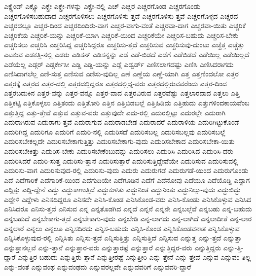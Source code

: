 {ಎಕ್ಸ್ಟೆಂಡ್
ಎಕ್ಸ್ಪೊ
ಎಕ್ಸ್ರೇ
ಎಕ್ಸ್ರೇ-ಗಳನ್ನು
ಎಕ್ಸ್ರೇ-ನಲ್ಲಿ
ಎಚ್
ಎಚ್ಚರ
ಎಚ್ಚರಗೊಂಡ
ಎಚ್ಚರಗೊಂಡು
ಎಚ್ಚರಗೊಳಿಸಬಹುದಾದ
ಎಚ್ಚರಗೊಳಿಸಲು
ಎಚ್ಚರಗೊಳಿಸು-ತ್ತದೆ
ಎಚ್ಚರಗೊಳಿಸು-ತ್ತವೆ
ಎಚ್ಚರಗೊಳ್ಳದ
ಎಚ್ಚರದ
ಎಚ್ಚರದಲ್ಲೂ
ಎಚ್ಚರ-ದಿಂದ
ಎಚ್ಚರದಿಂದಿರು-ವಾಗ
ಎಚ್ಚರ-ವಾಗು-ವಂತೆ
ಎಚ್ಚರವಾ-ದಾಗ
ಎಚ್ಚರವಾ-ಯಿತು
ಎಚ್ಚರಿಕೆ
ಎಚ್ಚರಿಕೆಯ
ಎಚ್ಚರಿಕೆ-ಯನ್ನು
ಎಚ್ಚರಿಕೆ-ಯಾಗಿ
ಎಚ್ಚರಿಕೆ-ಯಿಂದ
ಎಚ್ಚರಿಕೆಯೇ
ಎಚ್ಚರಿಸ-ಬಹುದು
ಎಚ್ಚರಿಸ-ಬೇಕು
ಎಚ್ಚರಿಸಲು
ಎಚ್ಚರಿಸಿ
ಎಚ್ಚರಿಸಿದ್ದ
ಎಚ್ಚರಿಸಿದ್ದರೂ
ಎಚ್ಚರಿಸು-ತ್ತದೆ
ಎಚ್ಚರಿಸುವ
ಎಚ್ಚರಿಸುವು-ದುಂಟು
ಎಚ್ಚೆತ್ತ
ಎಚ್ಚೆತ್ತು
ಎಟಕುವ
ಎಡಕತ್ತಿ-ನಲ್ಲಿ
ಎಡರು
ಎಡಿಸನ್
ಎಡಿಸನ್ನನ್ನು
ಎಡೆ
ಎಡೆ-ಬಿಡದೆ
ಎಡೆಗೆ
ಎಡೆಬಿಡದೆ
ಎಡೆಯಿಲ್ಲ
ಎಡೆಯಿಲ್ಲದೆ
ಎಡೆಯೆಲ್ಲ
ಎಡ್ಗರ್
ಎಡ್ಗರ್ಕೇಸೀ
ಎಡ್ಡಿ
ಎಡ್ಡಿ-ಯನ್ನು
ಎಡ್ಲೆ
ಎಡ್ವರ್ಡ್
ಎಣಿಸಲಾಗದಷ್ಟು
ಎಣಿಸಿ
ಎಣಿಸಿದರಾಗದು
ಎಣಿಸಿದಾಗಲೆಲ್ಲ
ಎಣಿ-ಸುತ್ತ
ಎಣಿಸುವ
ಎಣಿಸು-ವುದಿಲ್ಲ
ಎಣೆ
ಎಣ್ಣೆಯ
ಎಣ್ಣೆ-ಯಾಗಿ
ಎತ್ತ
ಎತ್ತಣಿಂದಲೋ
ಎತ್ತರ
ಎತ್ತರಕ್ಕೆ
ಎತ್ತರದ
ಎತ್ತರ-ದಲ್ಲಿ
ಎತ್ತರದಲ್ಲಿದ್ದರೂ
ಎತ್ತರದಲ್ಲಿದ್ದ-ವರು
ಎತ್ತರದಲ್ಲಿರುವವರೆಂದು
ಎತ್ತರ-ದಿಂದ
ಎತ್ತರಬದುಕಿನ
ಎತ್ತರ-ವನ್ನು
ಎತ್ತರ-ವನ್ನೂ
ಎತ್ತರ-ವಾದ
ಎತ್ತರವಿರುವ
ಎತ್ತರವೆಷ್ಟು
ಎತ್ತಲಾರದಾದ
ಎತ್ತಲು
ಎತ್ತಿ
ಎತ್ತಿಕಟ್ಟಿ
ಎತ್ತಿಕೊಳ್ಳಲು
ಎತ್ತಿತಂದು
ಎತ್ತಿತೋರಿ
ಎತ್ತಿನ
ಎತ್ತಿಬಿಡಬಲ್ಲೆ
ಎತ್ತಿಹಿಡಿದು
ಎತ್ತಿಹುದು
ಎತ್ತುಗಳಿಂದಕಾಯವೆಂಬ
ಎತ್ತುತ್ತಿದ್ದ
ಎತ್ತು-ತ್ತೇವೆ
ಎತ್ತುವ
ಎತ್ತುವ-ವರು
ಎತ್ತುವುದೇ
ಎದು-ರಲ್ಲಿ
ಎದುರಲ್ಲಿಟ್ಟು
ಎದುರಲ್ಲೇ
ಎದುರಾಗಿ
ಎದುರಾಗಿರುವ
ಎದುರಾಗು-ತ್ತವೆ
ಎದುರಾಗುವ
ಎದುರಾಡಬೇಡ
ಎದುರಾದರೆ
ಎದುರಾಳಿಯ
ಎದುರಿಗಿಟ್ಟುಕೊಂಡೆ
ಎದುರಿಗಿದ್ದ
ಎದುರಿಗೂ
ಎದುರಿಗೆ
ಎದುರಿ-ನಲ್ಲಿ
ಎದುರಿಸದೆ
ಎದುರಿಸಬಲ್ಲ
ಎದುರಿಸಬಲ್ಲವು
ಎದುರಿಸಬಲ್ಲೆ
ಎದುರಿಸಬೇಕಲ್ಲದೇ
ಎದುರಿಸಬೇಕಾಗುತ್ತಿತ್ತು
ಎದುರಿಸಬೇಕಾಗು-ವುದು
ಎದುರಿಸಬೇಕಾದ
ಎದುರಿಸಬೇಕಾ-ಯಿತು
ಎದುರಿಸಬೇಕಿತ್ತು
ಎದುರಿಸ-ಬೇಕು
ಎದುರಿಸಬೇಕೆಂಬುದನ್ನು
ಎದುರಿಸಲು
ಎದುರಿಸಿ
ಎದುರಿಸಿದ
ಎದುರಿಸಿ-ದರು
ಎದುರಿಸಿದರೆ
ಎದುರಿ-ಸುತ್ತ
ಎದುರಿಸು-ತ್ತಾನೆ
ಎದುರಿಸುತ್ತಾರೆ
ಎದುರಿಸುತ್ತಿದ್ದೇವೆಯೇ
ಎದುರಿಸುವ
ಎದುರಿಸುವಲ್ಲಿ
ಎದುರಿಸು-ವಾಗ
ಎದುರಿಸುವುದ-ರಲ್ಲಿ
ಎದುರಿಸು-ವುದು
ಎದುರು
ಎದುರುಗಡೆ
ಎದುರುಗಡೆ-ಯಿಂದ
ಎದುರುಗೊಂಡು
ಎದೆ
ಎದೆಗಾರಿಕೆ
ಎದೆಗಾರಿಕೆ-ಯಿಂದ
ಎದೆಗುದಿಯೇ
ಎದೆಗೂಡಿನ
ಎದೆಗೆ
ಎದೆನೋವು
ಎದೆಯೂ
ಎದೆಯೊಡ್ಡಿ
ಎದ್ದಾಗ
ಎದ್ದಿತ್ತು
ಎದ್ದಿ-ದ್ದೇನೆ
ಎದ್ದು
ಎದ್ದುಕಾಣುತ್ತಿದೆ
ಎದ್ದುಕುಳಿತು
ಎದ್ದುನಿಂತ
ಎದ್ದುನಿಂತು
ಎದ್ದುನಿಲ್ಲು-ವುದು
ಎದ್ದುಬಿದ್ದು
ಎದ್ದೇಳಿ
ಎದ್ದೇಳು
ಎನಿಸದಿದ್ದರೂ
ಎನಿಸದೇ
ಎನಿಸಿ-ಕೊಂಡ
ಎನಿಸಿಕೊಂಡ-ವರು
ಎನಿಸಿ-ಕೊಂಡು
ಎನಿಸಿಕೊಳ್ಳುವ
ಎನಿಸಿದ
ಎನಿಸಿದರೂ
ಎನಿಸು-ತ್ತದೆ
ಎನಿಸುವ
ಎನ್ನ
ಎನ್ನತೊಡಗಿದ
ಎನ್ನದೆ
ಎನ್ನನೆ
ಎನ್ನನೇ
ಎನ್ನಬಲ್ಲೆವೆ
ಎನ್ನಬಹು
ಎನ್ನ-ಬಹುದು
ಎನ್ನಬಹುದೆ
ಎನ್ನಬೇಕಾಗು-ತ್ತದೆ
ಎನ್ನಬೇಕಾಗು-ವುದು
ಎನ್ನಬೇಡಿ
ಎನ್ನ-ಲಾಗದು
ಎನ್ನ-ಲಾಗಿದೆ
ಎನ್ನಲಾದೀತೆ
ಎನ್ನ-ಲಾರ
ಎನ್ನಲಾರೆ
ಎನ್ನಲು
ಎನ್ನಲೂ
ಎನ್ನಿಸದಿರದು
ಎನ್ನಿಸ-ಬಹುದು
ಎನ್ನಿಸಿ-ಕೊಂಡ
ಎನ್ನಿಸಿಕೊಂಡವನಾತ
ಎನ್ನಿಸಿಕೊಳ್ಳುವ
ಎನ್ನಿಸಿಕೊಳ್ಳುವುದ-ರಲ್ಲಿ
ಎನ್ನಿಸಿತು
ಎನ್ನಿಸು-ತ್ತದೆ
ಎನ್ನಿಸುತ್ತಿತ್ತು
ಎನ್ನಿಸುತ್ತಿದೆ
ಎನ್ನಿಸುವ
ಎನ್ನುತ್ತ
ಎನ್ನು-ತ್ತದೆ
ಎನ್ನುತ್ತಾ
ಎನ್ನುತ್ತಾನಲ್ಲವೆ
ಎನ್ನು-ತ್ತಾನೆ
ಎನ್ನುತ್ತಾರ-ವರು
ಎನ್ನುತ್ತಾರಷ್ಟೆ
ಎನ್ನುತ್ತಾರೆ
ಎನ್ನುತ್ತಿದ್ದರ-ವರು
ಎನ್ನುತ್ತಿದ್ದರು
ಎನ್ನು-ತ್ತಿ-ದ್ದಾರೆ
ಎನ್ನುತ್ತಿರ-ಬಹುದು
ಎನ್ನುತ್ತಿರು-ತ್ತಾನೆ
ಎನ್ನುತ್ತೀರಷ್ಟೆ
ಎನ್ನುತ್ತೀರಿ
ಎನ್ನು-ತ್ತೇನೆ
ಎನ್ನು-ತ್ತೇವೆ
ಎನ್ನುವ
ಎನ್ನುವಂ-ತಿಲ್ಲ
ಎನ್ನು-ವಂತೆ
ಎನ್ನುವಂಥ
ಎನ್ನುವಂಥದು
ಎನ್ನುವರಲ್ಲವೇ
ಎನ್ನುವವರಿಗೆ
ಎನ್ನುವವರಿ-ದ್ದಾರೆ
}
